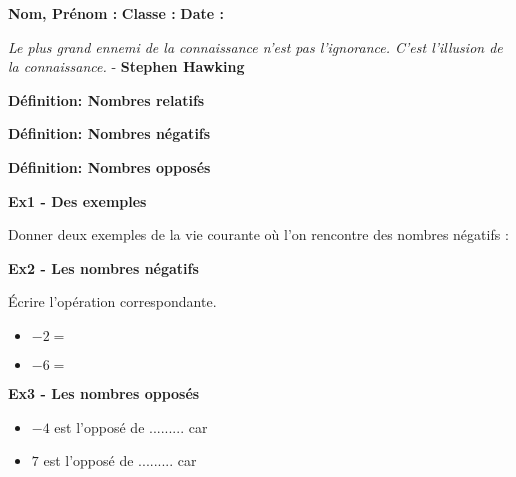 



\textbf{Nom, Prénom :} \hspace{8cm} \textbf{Classe :} \hspace{3cm} \textbf{Date :}\\

\begin{center}
  \textit{Le plus grand ennemi de la connaissance n'est pas l'ignorance. C'est l'illusion de la connaissance.} - \textbf{Stephen Hawking}
\end{center}

\textbf{Définition: Nombres relatifs} \\ \Pointilles[3]

\textbf{Définition: Nombres négatifs} \\ \Pointilles[3]

\textbf{Définition: Nombres opposés} \\ \Pointilles[3]

\textbf{Ex1 - Des exemples}

Donner deux exemples de la vie courante où l'on rencontre des nombres négatifs : \\ \Pointilles[1]


\textbf{Ex2 - Les nombres négatifs}

Écrire l'opération correspondante.

\begin{multicols}{2}
\begin{itemize}[label={$\bullet$}]
  \item $-2 =$ \dotfill
  \item $-6 =$ \dotfill
\end{itemize} 
\end{multicols}

\textbf{Ex3 - Les nombres opposés}

\begin{multicols}{2}
\begin{itemize}[label={$\bullet$}]
  \item $-4$ est l'opposé de ......... car \dotfill
  \item $ 7$ est l'opposé de ......... car \dotfill
\end{itemize} 
\end{multicols}


